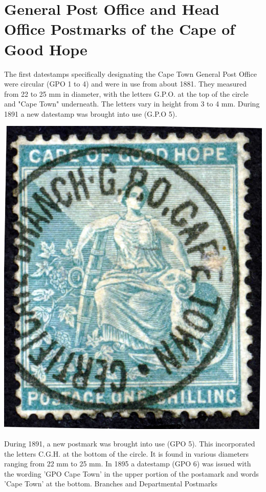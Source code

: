 \chapter{General Post Office and Head Office Postmarks of the Cape of Good Hope}
 


The first datestamps specifically designating the Cape 
Town General Post Office were circular (GPO 1 to 4) and were in use 
from about 1881. They measured from 22 to 25 mm in diameter, 
with the letters G.P.O. at the top of the circle and "Cape Town" 
underneath. The letters vary in height from 3 to 4 mm. During 1891 
a new datestamp was brought into use (G.P.O 5).
\begin{marginfigure}
\includegraphics[width=1.0\textwidth]{../cape-of-good-hope/GPO/Certificate.jpg}
\end{marginfigure}


During 1891, a new postmark was brought into use (GPO 5). 
This incorporated the letters C.G.H. at the bottom of the circle. 
It is found in various diameters ranging from 22 mm to 25 mm. 
In 1895 a datestamp (GPO 6) was issued with the wording 
'GPO Cape Town' in the upper portion of the postamark and 
words 'Cape Town' at the bottom.
Branches and Departmental Postmarks

